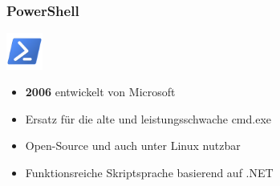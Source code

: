 \begin{frame}
    \frametitle{PowerShell}
    \includegraphics[height=1.2cm]{res/powershell.png}
    \begin{itemize}
        \item \textbf{2006} entwickelt von Microsoft
        \item Ersatz für die alte und leistungsschwache cmd.exe
        \item Open-Source und auch unter Linux nutzbar
        \item Funktionsreiche Skriptsprache basierend auf .NET
    \end{itemize}
\end{frame}
